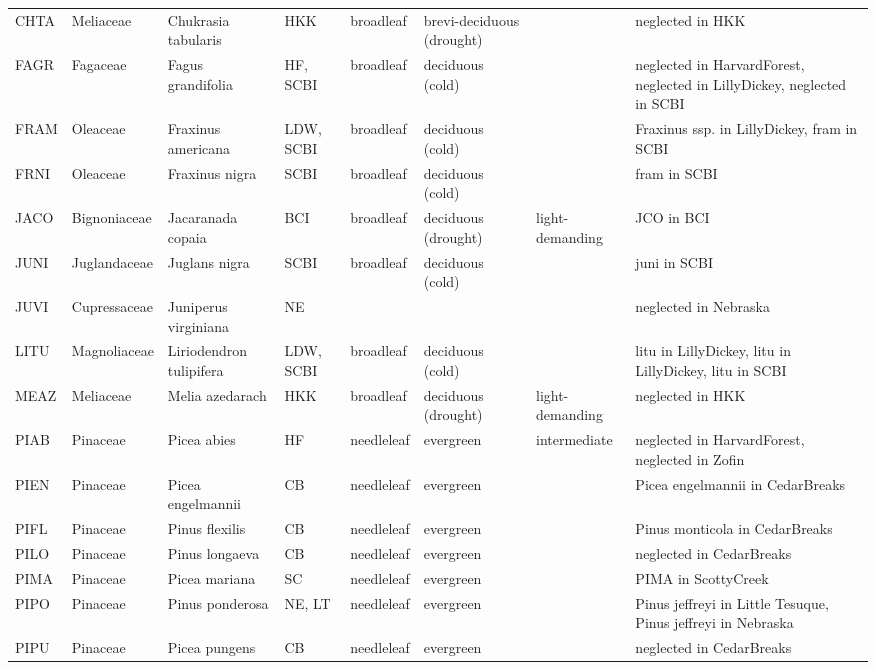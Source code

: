 \documentclass[
]{article}
\begin{document}
\begin{table}[!h]
{\begin{tabular}{lllllll>{\raggedright\arraybackslash}p{5cm}}
\addlinespace
CHTA & Meliaceae & Chukrasia tabularis & HKK & broadleaf & brevi-deciduous (drought) &  & neglected in HKK\\
\addlinespace
FAGR & Fagaceae & Fagus grandifolia & HF, SCBI & broadleaf & deciduous (cold) &  & neglected in HarvardForest, neglected in LillyDickey, neglected in SCBI\\
\addlinespace
FRAM & Oleaceae & Fraxinus americana & LDW, SCBI & broadleaf & deciduous (cold) &  & Fraxinus ssp. in LillyDickey, fram in SCBI\\
\addlinespace
FRNI & Oleaceae & Fraxinus nigra & SCBI & broadleaf & deciduous (cold) &  & fram in SCBI\\
\addlinespace
JACO & Bignoniaceae & Jacaranada copaia & BCI & broadleaf & deciduous (drought) & light-demanding & JCO in BCI\\
\addlinespace
JUNI & Juglandaceae & Juglans nigra & SCBI & broadleaf & deciduous (cold) &  & juni in SCBI\\
\addlinespace
JUVI & Cupressaceae & Juniperus virginiana & NE &  &  &  & neglected in Nebraska\\
\addlinespace
LITU & Magnoliaceae & Liriodendron tulipifera & LDW, SCBI & broadleaf & deciduous (cold) &  & litu in LillyDickey, litu in LillyDickey, litu in SCBI\\
\addlinespace
MEAZ & Meliaceae & Melia azedarach & HKK & broadleaf & deciduous (drought) & light-demanding & neglected in HKK\\
\addlinespace
PIAB & Pinaceae & Picea abies & HF & needleleaf & evergreen & intermediate & neglected in HarvardForest, neglected in Zofin\\
\addlinespace
PIEN & Pinaceae & Picea engelmannii & CB & needleleaf & evergreen &  & Picea engelmannii in CedarBreaks\\
\addlinespace
PIFL & Pinaceae & Pinus flexilis & CB & needleleaf & evergreen &  & Pinus monticola in CedarBreaks\\
\addlinespace
PILO & Pinaceae & Pinus longaeva & CB & needleleaf & evergreen &  & neglected in CedarBreaks\\
\addlinespace
PIMA & Pinaceae & Picea mariana & SC & needleleaf & evergreen &  & PIMA in ScottyCreek\\
\addlinespace
PIPO & Pinaceae & Pinus ponderosa & NE, LT & needleleaf & evergreen &  & Pinus jeffreyi in Little Tesuque, Pinus jeffreyi in Nebraska\\
\addlinespace
PIPU & Pinaceae & Picea pungens & CB & needleleaf & evergreen &  & neglected in CedarBreaks\\

\end{tabular}}
\end{table}
\end{document}
